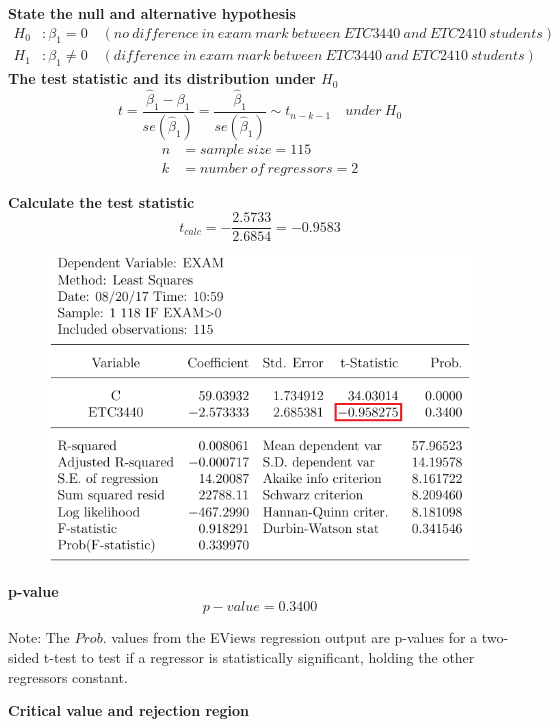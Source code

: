 \documentclass[12pt]{report}
\begin{document}
\justify \noindent \textbf{State the null and alternative hypothesis}
\begin{align*}
H_0&: \beta_1 = 0 \quad (no\ difference\ in\ exam\ mark\ between\ ETC3440\ and\ ETC2410\ students) \\
H_1&: \beta_1 \neq 0 \quad (difference\ in\ exam\ mark\ between\ ETC3440\ and\ ETC2410\ students)
\end{align*}
\noindent \textbf{The test statistic and its distribution under $H_0$}
$$t = \dfrac{\hat{\beta}_1 - \beta_1}{se(\hat{\beta}_1)} = \dfrac{\hat{\beta}_1}{se(\hat{\beta}_1)} \sim t_{n-k-1} \quad under\ H_0$$
\begin{align*}
n &= sample\ size = 115 \\
k &= number\ of\ regressors = 2
\end{align*}

\noindent \textbf{Calculate the test statistic}
$$t_{calc} = -\dfrac{2.5733}{2.6854} = -0.9583$$
\begin{figure}[H]
	\centering
	\includegraphics{q1_10}
\end{figure}
\vspace{-\baselineskip}
\noindent \textbf{p-value}
$$p-value = 0.3400$$

\noindent Note: The $Prob.$ values from the EViews regression output are p-values for a two-sided t-test to test if a regressor is statistically significant, holding the other regressors constant.

\noindent \textbf{Critical value and rejection region}
\end{document}
